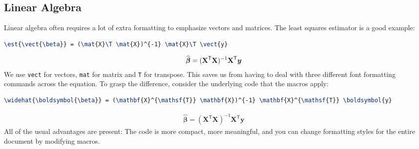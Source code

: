 \documentclass[a4paper,10pt]{scrartcl}
\begin{document}
\subsection{Linear Algebra}
Linear algebra often requires a lot of extra formatting to emphasize vectors and matrices. The least squares estimator is a good example:
\begin{lstlisting}[caption=OLS, language=TeX]
\est{\vect{\beta}} = (\mat{X}\T \mat{X})^{-1} \mat{X}\T \vect{y}
\end{lstlisting}
\begin{align}
\widehat{\boldsymbol{\beta}} = (\boldsymbol{\mathbf{X}}^\mathsf{T} \boldsymbol{\mathbf{X}})^{-1} \boldsymbol{\mathbf{X}}^\mathsf{T} \boldsymbol{y}
\end{align}
We use \texttt{vect} for vectors, \texttt{mat} for matrix and \texttt{T} for transpose. This saves us from having to deal with three different font formatting commands across the equation. To grasp the difference, consider the underlying code that the macros apply:
\begin{lstlisting}[caption=OLS with direct formatting, language=TeX]
\widehat{\boldsymbol{\beta}} = (\mathbf{X}^{\mathsf{T}} \mathbf{X})^{-1} \mathbf{X}^{\mathsf{T}} \boldsymbol{y}
\end{lstlisting}
\begin{align}
  \widehat{\boldsymbol{\beta}} = (\mathbf{X}^{\mathsf{T}} \mathbf{X})^{-1} \mathbf{X}^{\mathsf{T}} \boldsymbol{y}
\end{align}
All of the usual advantages are present: The code is more compact, more meaningful, and you can change formatting styles for the entire document by modifying macros.
\end{document}
